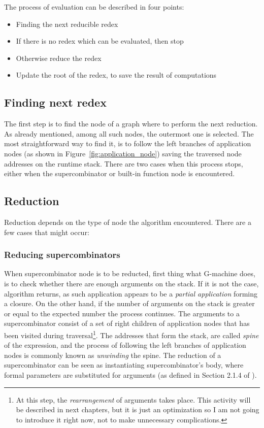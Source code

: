 \documentclass[12pt,a4paper]{report}
\begin{document}
The process of evaluation can be described in four points:

\begin{itemize}
  \item Finding the next reducible redex
  \item If there is no redex which can be evaluated, then stop
  \item Otherwise reduce the redex
  \item Update the root of the redex, to save the result of computations
\end{itemize}

\subsection{Finding next redex}
The first step is to find the node of a graph where to perform the next
reduction. As already mentioned, among all such nodes, the outermost one is
selected. The most straightforward way to find it, is to follow the left
branches of application nodes (as shown in Figure~\ref{fig:application_node})
saving the traversed node addresses on the runtime stack. There are two cases
when this process stops, either when the supercombinator or built-in function
node is encountered.

\subsection{Reduction}
Reduction depends on the type of node the algorithm encountered. There are a
few cases that might occur:

\subsubsection{Reducing supercombinators}
When supercombinator node is to be reducted, first thing what G-machine does,
is to check whether there are enough arguments on the stack. If it is not the
case, algorithm returns, as such application appears to be a \textit{partial
application} forming a closure. On the other hand, if the number of arguments
on the stack is greater or equal to the expected number the process continues.
The arguments to a supercombinator consist of a set of right children of
application nodes that has been visited during traversal\footnote{At this step,
the \textit{rearrangement} of arguments takes place. This activity will be
described in next chapters, but it is just an optimization so I am not going to
introduce it right now, not to make unnecessary complications.}. The addresses
that form the stack, are called \textit{spine} of the expression, and the
process of following the left branches of application nodes is commonly known
as \textit{unwinding} the spine. The reduction of a supercombinator can be
seen as instantiating supercombinator's body, where formal parameters are
substituted for arguments (as defined in Section 2.1.4 of \cite{JonLes00}).
\end{document}
